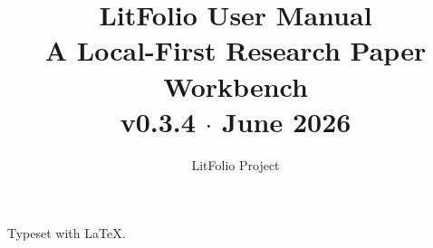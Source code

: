 \documentclass[11pt,a4paper,oneside]{book}
\title{%
  {\fontsize{32}{38}\selectfont\bfseries\color{ink} LitFolio User Manual}\\[1.2em]
  {\Large\color{violet} A Local-First Research Paper Workbench}\\[0.6em]
  {\large\color{muted} v0.3.4 \(\cdot\) June 2026}%
}
\author{LitFolio Project}
\date{}
\begin{document}
\frontmatter
\thispagestyle{empty}
\vspace*{4cm}
\begin{center}
\maketitle
\end{center}
\vfill
\begin{center}\small\color{muted}
  Typeset with \LaTeX{}.
\end{center}
\clearpage

\tableofcontents



\mainmatter




\backmatter
\end{document}
